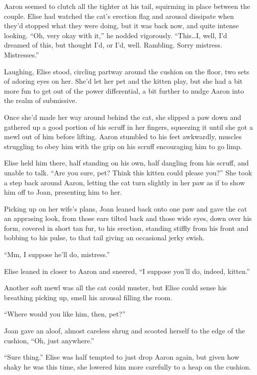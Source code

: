 Aaron seemed to clutch all the tighter at his tail, squirming in place between the couple. Elise had watched the cat's erection flag and arousal dissipate when they'd stopped what they were doing, but it was back now, and quite intense looking. ``Oh, very okay with it,'' he nodded vigorously. ``This\ldots{}I, well, I'd dreamed of this, but thought I'd, or I'd, well. Rambling. Sorry mistress.  Mistresses.''

Laughing, Elise stood, circling partway around the cushion on the floor, two sets of adoring eyes on her. She'd let her pet and the kitten play, but she had a bit more fun to get out of the power differential, a bit further to nudge Aaron into the realm of submissive.

Once she'd made her way around behind the cat, she slipped a paw down and gathered up a good portion of his scruff in her fingers, squeezing it until she got a mewl out of him before lifting. Aaron stumbled to his feet awkwardly, muscles struggling to obey him with the grip on his scruff encouraging him to go limp.

Elise held him there, half standing on his own, half dangling from his scruff, and unable to talk. ``Are you sure, pet? Think this kitten could please you?'' She took a step back around Aaron, letting the cat turn slightly in her paw as if to show him off to Joan, presenting him to her.

Picking up on her wife's plans, Joan leaned back onto one paw and gave the cat an apprasing look, from those ears tilted back and those wide eyes, down over his form, covered in short tan fur, to his erection, standing stiffly from his front and bobbing to his pulse, to that tail giving an occasional jerky swish.

``Mm, I suppose he'll do, mistress.''

Elise leaned in closer to Aaron and sneered, ``I suppose you'll do, indeed, kitten.''

Another soft mewl was all the cat could muster, but Elise could sense his breathing picking up, smell his arousal filling the room.

``Where would you like him, then, pet?''

Joan gave an aloof, almost careless shrug and scooted herself to the edge of the cushion, ``Oh, just anywhere.''

``Sure thing.'' Elise was half tempted to just drop Aaron again, but given how shaky he was this time, she lowered him more carefully to a heap on the cushion.

